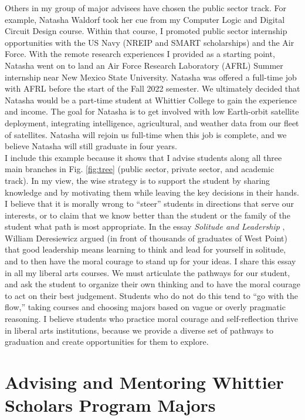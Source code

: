 \documentclass[../../main.tex]{subfiles}
\begin{document}
Others in my group of major advisees have chosen the public sector track.  For example, Natasha Waldorf took her cue from my Computer Logic and Digital Circuit Design course.  Within that course, I promoted public sector internship opportunities with the US Navy (NREIP and SMART scholarships) and the Air Force.  With the remote research experiences I provided as a starting point, Natasha went on to land an Air Force Research Laboratory (AFRL) Summer internship near New Mexico State University.  Natasha was offered a full-time job with AFRL before the start of the Fall 2022 semester.  We ultimately decided that Natasha would be a part-time student at Whittier College to gain the experience and income.  The goal for Natasha is to get involved with low Earth-orbit satellite deployment, integrating intelligence, agricultural, and weather data from our fleet of satellites.  Natasha will rejoin us full-time when this job is complete, and we believe Natasha will still graduate in four years.
\\
\vspace{0.15cm}
I include this example because it shows that I advise students along all three main branches in Fig. \ref{fig:tree} (public sector, private sector, and academic track).  In my view, the wise strategy is to support the student by sharing knowledge and by motivating them while leaving the key decisions in their hands.  I believe that it is morally wrong to ``steer'' students in directions that serve our interests, or to claim that we know better than the student or the family of the student what path is most appropriate.  In the essay \textit{Solitude and Leadership} \cite{west_point}, William Deresiewicz argued (in front of thousands of graduates of West Point) that good leadership means learning to think and lead for yourself in solitude, and to then have the moral courage to stand up for your ideas.  I share this essay in all my liberal arts courses.  We must articulate the pathways for our student, and ask the student to organize their own thinking and to have the moral courage to act on their best judgement.  Students who do not do this tend to ``go with the flow,'' taking courses and choosing majors based on vague or overly pragmatic reasoning.  I believe students who practice moral courage and self-reflection thrive in liberal arts institutions, because we provide a diverse set of pathways to graduation and create opportunities for them to explore.

\section{Advising and Mentoring Whittier Scholars Program Majors}
\end{document}
